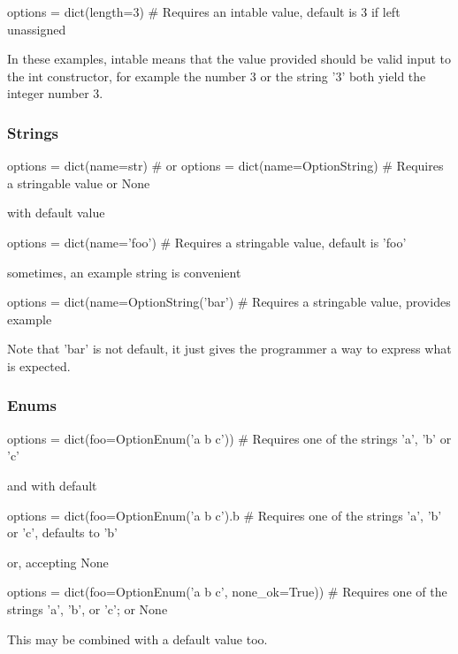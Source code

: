 \begin{python}
  options = dict(length=3)
  # Requires an intable value, default is 3 if left unassigned
\end{python}
In these examples, intable means that the value provided should be
valid input to the int constructor, for example the number 3 or the
string '3' both yield the integer number 3.



\subsubsection*{Strings}
\begin{python}
  options = dict(name=str)           # or
  options = dict(name=OptionString)
  # Requires a stringable value or None
\end{python}
with default value

\begin{python}
  options = dict(name='foo')
  # Requires a stringable value, default is 'foo'
\end{python}
sometimes, an example string is convenient

\begin{python}
  options = dict(name=OptionString('bar')
  # Requires a stringable value, provides example
\end{python}
Note that 'bar' is not default, it just gives the programmer a way to
express what is expected.



\subsubsection*{Enums}
\begin{python}
  options = dict(foo=OptionEnum('a b c'))
  # Requires one of the strings 'a', 'b' or 'c'
\end{python}
and with default

\begin{python}
  options = dict(foo=OptionEnum('a b c').b
   # Requires one of the strings 'a', 'b' or 'c', defaults to 'b'
\end{python}
or, accepting None

\begin{python}
options = dict(foo=OptionEnum('a b c', none_ok=True))
# Requires one of the strings 'a', 'b', or 'c'; or None
\end{python}
This may be combined with a default value too.


